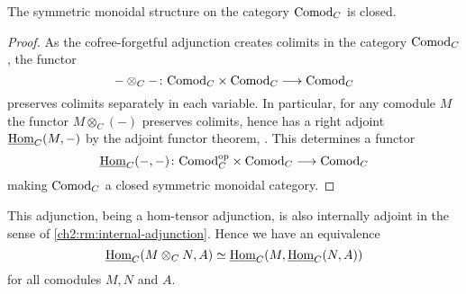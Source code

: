     



\begin{lemma}
    The symmetric monoidal structure on the category $\mathrm{Comod}_C$ is closed. 
\end{lemma}
\begin{proof}
    As the cofree-forgetful adjunction creates colimits in the category $\mathrm{Comod}_C$, the functor 
    \[-\otimes_C- \colon \mathrm{Comod}_C \times \mathrm{Comod}_C \longrightarrow \mathrm{Comod}_C\] 
    preserves colimits separately in each variable. In particular, for any comodule $M$ the functor $M\otimes_C (-)$ preserves colimits, hence has a right adjoint $\operatorname{\underline{Hom}}_C(M,-)$ by the adjoint functor theorem, \cite[5.5.2.9]{lurie_09}. This determines a functor 
    \[\operatorname{\underline{Hom}}_C(-,-)\colon \mathrm{Comod}_C^{\mathrm{op}}\times \mathrm{Comod}_C\longrightarrow \mathrm{Comod}_C\]
    making $\mathrm{Comod}_C$ a closed symmetric monoidal category.  
\end{proof}

\begin{remark}
    This adjunction, being a hom-tensor adjunction, is also internally adjoint in the sense of \cref{ch2:rm:internal-adjunction}. Hence we have an equivalence 
    \[\operatorname{\underline{Hom}}_C(M\otimes_C N, A) \simeq \operatorname{\underline{Hom}}_C(M, \operatorname{\underline{Hom}}_C(N, A))\]
    for all comodules $M, N$ and $A$. 
\end{remark}

